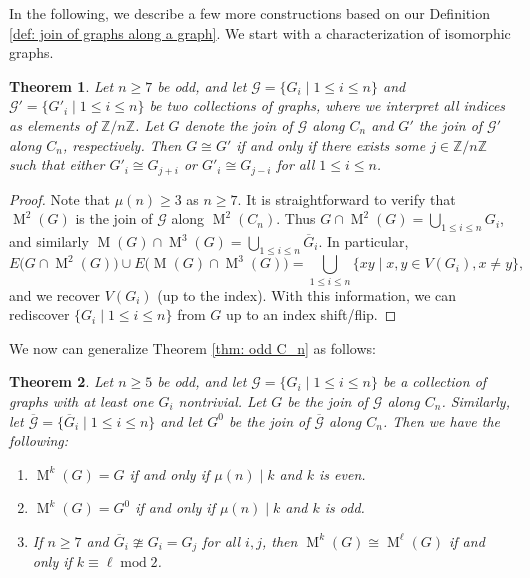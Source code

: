 \documentclass[12pt]{amsart}
\newtheorem{theorem}{Theorem}[section]
\theoremstyle{definition}
\theoremstyle{remark}
\numberwithin{equation}{section}
\numberwithin{figure}{section}
\renewcommand{\mod}{\operatorname{mod}}
\newcommand{\M}{\operatorname{M}}
\newcommand{\Z}{\mathbb{Z}}
\begin{document}
In the following, we describe a few more constructions based on our Definition \ref{def: join of graphs along a graph}. We start with a characterization of isomorphic graphs.

\begin{theorem} \label{thm: isomorphic join}
    Let $n \geq 7$ be odd, and let $\mathcal{G}=\{G_i \mid 1\leq i \leq n\}$ and $\mathcal{G}'=\{G'_i \mid 1\leq i \leq n\}$ be two collections of graphs, where we interpret all indices as elements of $\Z/n\Z$. Let $G$ denote the join of $\mathcal{G}$ along $C_n$ and $G'$ the join of $\mathcal{G}'$ along $C_n$, respectively.
    Then $G\cong G'$ if and only if there exists some $j\in \Z/n\Z$ such that either $G'_i\cong G_{j+i}$ or $G'_i\cong G_{j-i}$ for all $1\leq i \leq n$.
\end{theorem}

\begin{proof}
    Note that $\mu(n) \ge 3$ as $n\ge 7$. It is straightforward to verify that $\M^2(G)$ is the join of $\mathcal{G}$ along $\M^2(C_n)$. Thus $G \cap \M^2(G) =\bigcup_{1\leq i \leq n} G_i$, and similarly $\M(G) \cap \M^3(G) =\bigcup_{1\leq i \leq n} \overline{G}_i$. In particular,
    $$E\big(G \cap \M^2(G)\big)\cup E\big(\M(G) \cap \M^3(G)\big)= \bigcup_{1\leq i \leq n} \{xy \mid x,y \in V(G_i), x\ne y\},$$
    and we recover $V(G_i)$ (up to the index). With this information, we can rediscover $\{G_i \mid 1\leq i \leq n\}$ from $G$ up to an index shift/flip.
\end{proof}

We now can generalize Theorem \ref{thm: odd C_n} as follows:

\begin{theorem} \label{thm: odd C_n with decorations}
    Let $n \geq 5$ be odd, and let $\mathcal{G}=\{G_i \mid 1\leq i \leq n\}$ be a collection of graphs with at least one $G_i$ nontrivial. Let $G$ be the join of $\mathcal{G}$ along $C_n$.
    Similarly, let $\overline{\mathcal{G}}=\{\overline{G}_i \mid 1\leq i \leq n\}$ and let $G^0$ be the join of $\overline{\mathcal{G}}$ along $C_n$.  Then we have the following:  
    \begin{enumerate}
        \item $\M^k(G)=G$ if and only if $\mu(n) \mid k$ and $k$ is even.
        \item $\M^k(G)=G^0$ if and only if $\mu(n) \mid k$ and $k$ is odd.
        \item If $n\ge 7$ and $\overline{G}_i\ncong G_i = G_j$ for all $i,j$, then $\M^k(G) \cong \M^\ell(G)$ if and only if $k\equiv \ell \mod 2$. 
    \end{enumerate}
\end{theorem}
\end{document}
